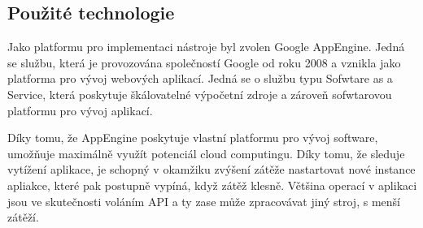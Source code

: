 \documentclass[bc,male,java,dept456]{diploma}						%
\begin{document}

\clearpage

\subsection{Použité technologie}

Jako platformu pro implementaci nástroje byl zvolen Google AppEngine. Jedná se službu, která je provozována společností Google od roku 2008 a vznikla jako platforma pro vývoj webových aplikací. Jedná se o službu typu Sofwtare as a Service, která poskytuje šká\-lo\-va\-tel\-né výpočetní zdroje a zároveň sofwtarovou platformu pro vývoj aplikací.

Díky tomu, že AppEngine poskytuje vlastní platformu pro vývoj software, umožňuje maximálně využít potenciál cloud computingu. Díky tomu, že sleduje vytížení aplikace, je schopný v okamžiku zvýšení zátěže nastartovat nové instance apliakce, které pak postupně vypíná, když zátěž klesně. Většina operací v aplikaci jsou ve skutečnosti voláním API a ty zase může zpracovávat jiný stroj, s menší zátěží. 
\end{document}
